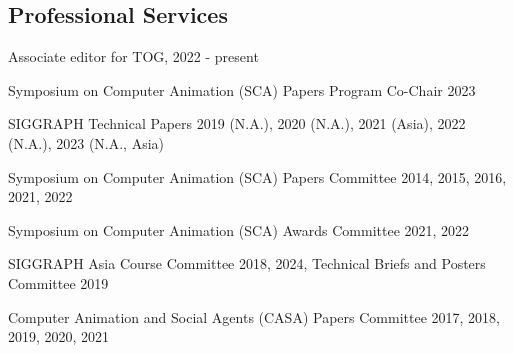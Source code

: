 \documentclass[margin,line]{res}
\begin{document}
\begin{resume}

\section{\sc Professional Services}
Associate editor for TOG, 2022 - present

\vspace*{-.15in}
Symposium on Computer Animation (SCA) Papers Program Co-Chair 2023

\vspace*{-.15in}
SIGGRAPH Technical Papers 2019 (N.A.), 2020 (N.A.), 2021 (Asia), 2022 (N.A.), 2023 (N.A., Asia)

\vspace*{-.15in}
Symposium on Computer Animation (SCA) Papers Committee 2014, 2015, 2016, 2021, 2022

\vspace*{-.15in}
Symposium on Computer Animation (SCA) Awards Committee 2021, 2022

\vspace*{-.15in}
SIGGRAPH Asia Course Committee 2018, 2024, Technical Briefs and Posters Committee 2019 

\vspace*{-.15in}
Computer Animation and Social Agents (CASA) Papers Committee 2017, 2018, 2019, 2020, 2021






\end{resume}
\end{document}
